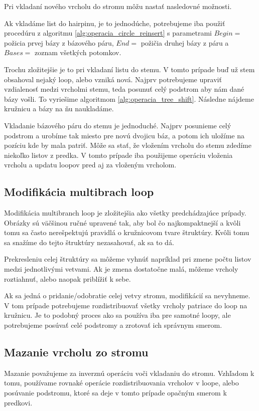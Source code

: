 Pri vkladaní nového vrcholu do stromu môžu nastať nasledovné možnosti.

Ak vkladáme list do hairpinu, je to jednodúche, potrebujeme iba použiť procedúru z algoritmu \ref{alg:operacia_circle_reinsert}
s parametrami $Begin = $ požicia prvej bázy z bázového páru, $End = $ požičia druhej bázy z páru
a $Bases = $ zoznam všetkých potomkov.

Trochu zložitejšie je to pri vkladaní listu do stemu. V tomto prípade buď už stem obsahoval nejaký loop, alebo vzniká nová.
Najprv potrebujeme upraviť vzdialenosť medzi vrcholmi stemu, teda posunuť celý podstrom aby nám dané bázy vošli.
To vyriešime algoritmom \ref{alg:operacia_tree_shift}. Následne nájdeme kružnicu a bázy na ňu naukladáme.

Vkladanie bázového páru do stemu je jednoduché. Najprv posunieme celý podstrom a urobíme tak miesto pre novú dvojicu
báz, a potom ich uložíme na pozíciu kde by mala patriť. Môže sa stať, že vložením vrcholu do stemu zdedíme niekoľko
listov z predka. V tomto prípade iba použijeme operáciu vloženia vrcholu a updatu loopov pred aj za vloženým vrcholom.

\subsection{Modifikácia multibrach loop}

Modifikácia multibranch loop je zložitejšia ako všetky predchádzajúce prípady. Obrázky sú väčšinou ručné upravené tak,
aby bol čo najkompaktnejší a kvôli tomu sa často nerešpektujú pravidlá o kružnicovom tvare štruktúry.
Kvôli tomu sa snažíme do tejto štruktúry nezasahovať, ak sa to dá.

Prekresleniu celej štruktúry sa môžeme vyhnúť napríklad pri zmene počtu listov medzi jednotlivými vetvami.
Ak je zmena dostatočne malá, môžeme vrcholy roztiahnuť, alebo naopak priblížiť k sebe.

Ak sa jedná o pridanie/odobratie celej vetvy stromu, modifikácií sa nevyhneme. V tom prípade potrebujeme
rozdistribuovať všetky vrcholy patriace do loop na kružnicu. Je to podobný proces ako sa používa iba pre samotné loopy,
ale potrebujeme posúvať celé podstromy a zrotovať ich správnym smerom.

\subsection{Mazanie vrcholu zo stromu}

Mazanie považujeme za inverznú operáciu voči vkladaniu do stromu. Vzhľadom k tomu, používame rovnaké operácie
rozdistribuovania vrcholov v loope, alebo posúvanie podstromu, ktoré sa deje v tomto prípade opačným smerom
k predkovi.

